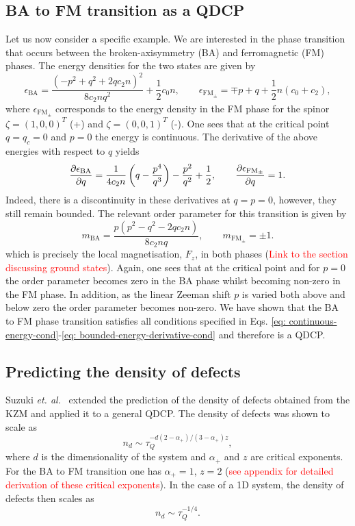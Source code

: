 \subsection{BA to FM transition as a QDCP}
Let us now consider a specific example.
We are interested in the phase transition that occurs between the
broken-axisymmetry (BA) and ferromagnetic (FM) phases.
The energy densities for the two states are given by~\cite{Kawaguchi2012}
\begin{equation}
    \epsilon_\mathrm{BA} = \frac{(-p^2 + q^2 +2qc_2n)^2}{8c_2nq^2} 
    + \frac{1}{2}c_0n, \qquad
    \epsilon_\mathrm{FM_{\pm}} = \mp p + q + \frac{1}{2}n(c_0 + c_2),
\end{equation}
where $\epsilon_\mathrm{FM_{\pm}}$ corresponds to the energy density in the
FM phase for the spinor $\zeta = (1, 0, 0)^T$ (+) and $\zeta = (0, 0, 1)^T$ (-).
One sees that at the critical point $q=q_c=0$ and $p=0$ the energy is
continuous.
The derivative of the above energies with respect to $q$ yields
\begin{equation}
    \pdv{\epsilon_\mathrm{BA}}{q} = 
    \frac{1}{4c_2n}\left(q - \frac{p^4}{q^3}\right) - \frac{p^2}{q^2}
    + \frac{1}{2},
    \qquad
    \pdv{\epsilon_\mathrm{FM_{\pm}}}{q} = 1.
\end{equation}
Indeed, there is a discontinuity in these derivatives at $q=p=0$, however,
they still remain bounded.
The relevant order parameter for this transition is given by
\begin{equation}
    m_\mathrm{BA} = \frac{p(p^2 - q^2 - 2qc_2n)}{8c_2nq},
    \qquad
    m_{\mathrm{FM}_{\pm}} = \pm 1.
\end{equation}
which is precisely the local magnetisation, $F_z$, in both phases
(\textcolor{red}{Link to the section discussing ground states}).
Again, one sees that at the critical point and for $p=0$ the order parameter
becomes zero in the BA phase whilst becoming non-zero in the FM phase.
In addition, as the linear Zeeman shift $p$ is varied both above and below
zero the order parameter becomes non-zero.
We have shown that the BA to FM phase transition satisfies all conditions
specified in Eqs.
\eqref{eq: continuous-energy-cond}-\eqref{eq: bounded-energy-derivative-cond}
and therefore is a QDCP.

\subsection{Predicting the density of defects}
Suzuki {\it et. al.}~\cite{Suzuki2015} extended the prediction of the density
of defects obtained from the KZM and applied it to a general QDCP.
The density of defects was shown to scale as
\begin{equation}
    n_d \sim \tau_Q^{-d(2-\alpha_+)/(3-\alpha_+)z},
\end{equation}
where $d$ is the dimensionality of the system and $\alpha_+$ and $z$ are
critical exponents.
For the BA to FM transition one has $\alpha_+=1$, $z=2$
(\textcolor{red}{see appendix for detailed derivation of these critical
exponents}).
In the case of a 1D system, the density of defects then scales as
\begin{equation}
    n_d \sim \tau_Q^{-1/4}.
\end{equation}



